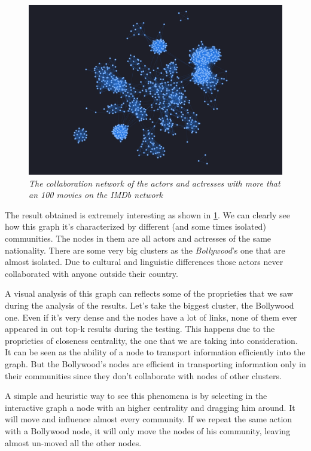 \begin{center}
    \s \nd {}
\end{center}

\begin{figure}[H]
    \centering
    \includegraphics[width=12cm]{Screenshot.png}
    \caption{\emph{The collaboration network of the actors and actresses with more that an 100 movies on the IMDb network}}
    \label{fig:imdb-a-network}

\end{figure}

The result obtained is extremely interesting as shown in \ref{fig:imdb-a-network}. We can clearly see how this graph it's characterized by different (and some times isolated) communities. The nodes in them are all actors and actresses of the same nationality. There are some very big clusters as the \emph{Bollywood}'s one that are almost isolated. Due to cultural and linguistic differences those actors never collaborated with anyone outside their country. \s

A visual analysis of this graph can reflects some of the proprieties that we saw during the analysis of the results. Let's take the biggest cluster, the Bollywood one. Even if it's very dense and the nodes have a lot of links, none of them ever appeared in out top-k results during the testing. This happens due to the proprieties of closeness centrality, the one that we are taking into consideration. It can be seen as the ability of a node to transport information efficiently into the graph. But the Bollywood's nodes are efficient in transporting information only in their communities since they don't collaborate with nodes of other clusters. \s

A simple and heuristic way to see this phenomena is by selecting in the interactive graph a node with an higher centrality and dragging him around. It will move and influence almost every community. If we repeat the same action with a Bollywood node, it will only move the nodes of his community, leaving almost un-moved all the other nodes.

